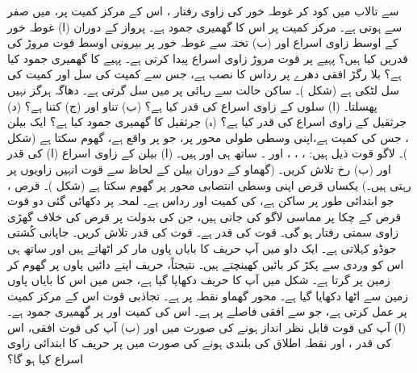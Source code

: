    سے  تالاب میں کود کر   غوطہ خور   کی زاوی رفتار     ، اس کے مرکز کمیت پر،  میں صفر سے  ہوتی ہے۔ مرکز کمیت  پر اس کا گھمیری جمود  ہے۔ پرواز کے دوران  (ا) غوطہ خور کے  اوسط زاوی اسراع اور (ب) تختہ سے غوطہ خور پر بیرونی اوسط قوت مروڑ کی قدریں کیا ہیں؟
پہیے پر  قوت مروڑ  زاوی اسراع پیدا کرتی ہے۔ پہیے کا گھمیری جمود کیا ہے؟
بلا رگڑ افقی  دھرے  پر رداس  کا     نصب ہے، جس سے کمیت  کی  سل  اور کمیت  کی سل  لٹکی ہے (شکل )۔ ساکن حالت سے رہائی پر    میں سل       گرتی ہے۔  دھاگہ  ہرگز نہیں پھسلتا۔ (ا) سلوں کے زاوی اسراع کی قدر کیا ہے؟ (ب) تناو  اور (ج)  کتنا ہے؟ (د)   جرثقیل  کے زاوی اسراع کی قدر کیا ہے؟ (ہ) جرثقیل  کا گھمیری جمود کیا ہے؟
ایک بیلن ، جس کی کمیت  ہے،اپنی  وسطی طولی  محور   پر، جو  پر واقع ہے،  گھوم سکتا ہے (شکل )۔  لاگو قوت ذیل ہیں:
 ، ، ، اور ۔ ساتھ ہی  اور  ہیں۔ (ا)  بیلن کے زاوی اسراع (ا)   کی قدر  اور (ب) رخ تلاش کریں۔ (گھماو کے دوران بیلن کے لحاظ سے  قوت انہیں زاویوں پر رہتی ہیں۔)
یکساں قرص اپنی وسطی  انتصابی  محور پر گھوم سکتا ہے (شکل )۔ قرص ، جو ابتدائی طور  پر ساکن ہے،  کی کمیت  اور رداس  ہے۔ لمحہ  پر دکھائی گئی دو قوت قرص کے چکا پر  مماسی لاگو کی جاتی ہیں، جن کی بدولت  پر قرص کی خلاف گھڑی  زاوی سمتی رفتار
  ہو گی۔ قوت  کی قدر  ہے۔ قوت  کی قدر تلاش کریں۔
جاپانی کُشتی   جوڈو  کہلاتی ہے۔  ایک داو میں  آپ حریف کا بایاں پاوں  مار کر اٹھاتے ہیں اور ساتھ ہی اس کو وردی سے پکڑ کر بائیں کھینچتے ہیں۔ نتیجتاً،  حریف اپنے دائیں پاوں پر گھوم کر زمین  پر گرتا ہے۔ شکل   میں آپ کا حریف دکھایا گیا ہے، جس میں اس کا بایاں پاوں زمین سے اٹھا  دکھایا گیا ہے۔ محور گھماو نقطہ  پر ہے۔ تجاذبی قوت  اس کے مرکز کمیت پر عمل کرتی ہے، جو  سے  افقی فاصلے پر ہے۔ اس کی کمیت   اور  پر گھمیری جمود  ہے۔ (ا)  آپ کی قوت  قابل نظر انداز ہونے کی صورت میں اور (ب)  آپ  کی قوت افقی، اس کی قدر  ، اور نقطہ اطلاق کی بلندی  ہونے کی صورت میں  پر  حریف کا ابتدائی زاوی اسراع کیا ہو گا؟
